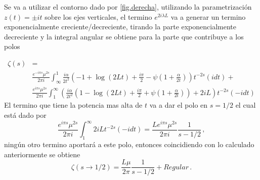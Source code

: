 Se va a utilizar el contorno dado por \ref{fig.derecha},
utilizando la parametrización $ z (t) = \pm i t$ sobre los ejes verticales, el termino $e ^{2 i \lambda L}$ va a generar un termino exponencialmente creciente/decreciente, tirando la parte exponencialmente decreciente y la integral angular se obtiene para la parte que contribuye a los polos
\begin{comment}
\begin{equation}
\begin{array}{c}
    \zeta  (s) = \\
     \frac{1}{2 \pi i} \int _{\infty} ^{1}
     \frac{ i \alpha }{2 t^2} 
     \left(
      1 + \frac{i \pi}{2} + Ln[2 t] + \psi (1 + \frac{\beta}{2 t})
     \right)
     t ^{-2s}
     e ^{- i \pi s} (i dt) + \\
     \frac{1}{2 \pi i} \int _{\infty} ^{1} 
     \left(
     2 + \frac{\beta}{2 t^2}
     \left(
     1 + \frac{i \pi}{2} - Ln[2 t] - \psi (1+ \frac{\beta}{2 t})
     \right)
     t ^{-2s}
     e ^{ i \pi s} (-i dt)
     \right)     
\end{array}
\end{equation}
\end{comment}
\begin{align}
    \zeta  (s) &= \\
     & \frac{e^{-i \pi s} \mu ^{2s}}{2 \pi i} \int _{\infty} ^{1}
     \frac{ i \alpha}{2 t^2}
     \left(
     - 1 +  \log (2 L t) + \frac{i \pi}{2}  - \psi \left( 1+\frac{\alpha}{2 t} \right)
     \right)
     t^{-2 s}
      \nonumber
     (i dt) + \\
     & \frac{e^{i \pi s} \mu ^{2s}}{2 \pi i} \int _1 ^{\infty}
	\left(      
     \frac{ i \alpha}{2  t^2}
     \left(
     1 -  \log (2 L t) + \frac{i \pi}{2} + \psi \left( 1 + \frac{\alpha}{2 t} \right)       
     \right)
     + 2 i L
     \right)
     t^{-2 s}
     (-i dt) \nonumber
\end{align}
El termino que tiene la potencia mas alta de $t$ va a dar el polo en $s=1/2$ el cual está dado por
\begin{equation}
    \frac{e^{i \pi s} \mu ^{2s} }{2 \pi i }
    \int _1 ^{\infty}
    2 i L    
    t ^{-2 s}
    (-i dt) =  
    \frac{L e^{i \pi s} \mu ^{2s}}{2 \pi i} \frac{1}{s-1/2   }
    	\, ,
\end{equation}
ningún otro termino aportará a este polo, entonces coincidiendo con lo calculado anteriormente se obtiene
\begin{equation}
    \zeta (s \rightarrow 1/2) = \frac{L \mu }{2 \pi} \frac{1}{s- 1/2 } + Regular
    	\, .
\end{equation}

